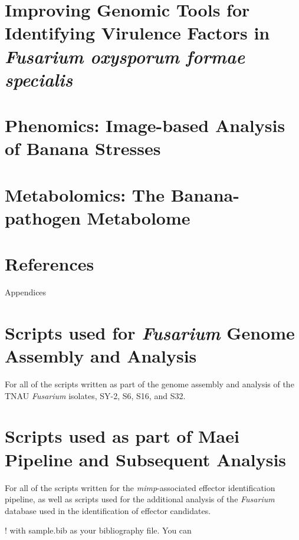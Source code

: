 \documentclass[11pt,a4paper]{report}
\begin{document}
\chapter{Improving Genomic Tools for Identifying Virulence Factors in   \textit{Fusarium oxysporum formae specialis}}
    
    
\chapter{Phenomics: Image-based Analysis of Banana Stresses}
    
    
 \chapter{Metabolomics: The Banana-pathogen Metabolome}
    

\chapter{References}
    \printbibliography 


Appendices
\appendix                            %
\chapter{Scripts used for \textit{Fusarium} Genome Assembly and Analysis}
For all of the scripts written as part of the genome assembly and analysis of the TNAU \textit{Fusarium} isolates, SY-2, S6, S16, and S32. 


\chapter{Scripts used as part of Maei Pipeline and Subsequent Analysis}
For all of the scripts written for the \textit{mimp}-associated effector identification pipeline, as well as scripts used for the additional analysis of the \textit{Fusarium} database used in the identification of effector candidates. 




                                 ! with sample.bib as your bibliography file. You can
                \begin{thebibliography}
                \end{thebibliography}

\begin{thesisauthorvita}             %
\end{thesisauthorvita}               %
\end{document}

